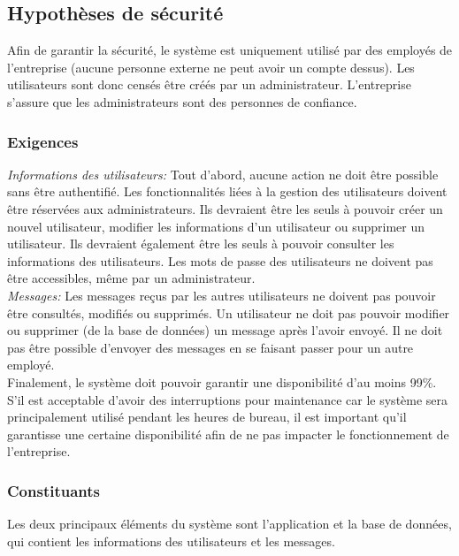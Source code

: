 \documentclass{article}
\begin{document}
\subsection{Hypothèses de sécurité}

Afin de garantir la sécurité, le système est uniquement utilisé par des employés de
l'entreprise (aucune personne externe ne peut avoir un compte dessus).
Les utilisateurs sont donc censés être créés par un administrateur.
L'entreprise s'assure que les administrateurs sont des personnes de
confiance.

\subsubsection{Exigences}

\textit{Informations des utilisateurs:} Tout d'abord, aucune action ne
doit être possible sans être authentifié. Les fonctionnalités liées à la
gestion des utilisateurs doivent être réservées aux administrateurs. Ils
devraient être les seuls à pouvoir créer un nouvel utilisateur, modifier
les informations d'un utilisateur ou supprimer un utilisateur. Ils
devraient également être les seuls à pouvoir consulter les informations
des utilisateurs. Les mots de passe des utilisateurs ne doivent pas être
accessibles, même par un administrateur.\\

\textit{Messages:} Les messages reçus par les autres utilisateurs ne
doivent pas pouvoir être consultés, modifiés ou supprimés. Un
utilisateur ne doit pas pouvoir modifier ou supprimer (de la base de
données) un message après l'avoir envoyé. Il ne doit pas être possible
d'envoyer des messages en se faisant passer pour un autre employé.\\

Finalement, le système doit pouvoir garantir une disponibilité d'au
moins 99\%. S'il est acceptable d'avoir des interruptions pour
maintenance car le système sera principalement utilisé pendant les
heures de bureau, il est important qu'il garantisse une certaine
disponibilité afin de ne pas impacter le fonctionnement de l'entreprise.

\subsubsection{Constituants}

Les deux principaux éléments du système sont l'application et la base de
données, qui contient les informations des utilisateurs et les messages.
\end{document}
